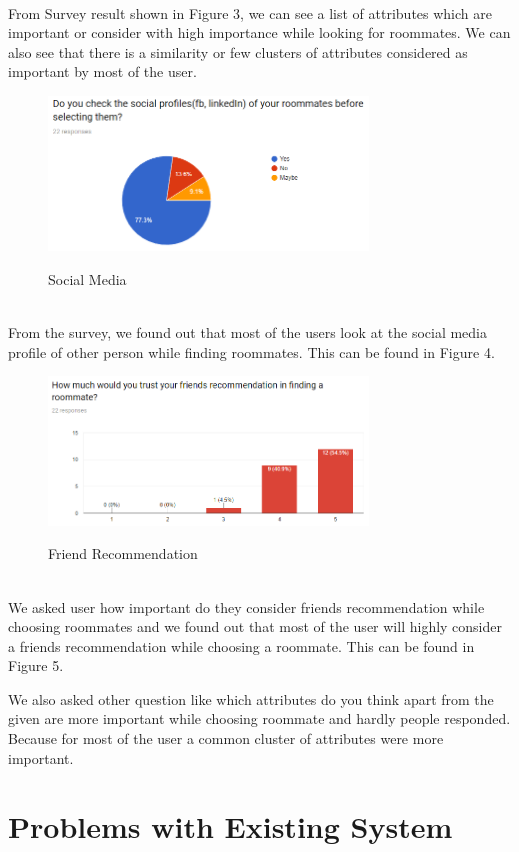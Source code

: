 \documentclass{sig-alternate-05-2015}
\begin{document}
\\
From Survey result shown in Figure 3, we can see a list of attributes which are important or consider with high importance while looking for roommates. We can also see that there is a similarity or few clusters of attributes considered as important by most of the user.
\\
\begin{figure}[h]
\centering
\includegraphics[width=8.5cm]{5.PNG}\\
\caption{Social Media}
\end{figure}
\\
From the survey, we found out that most of the users look at the social media profile of other person while finding roommates. This can be found in Figure 4.
\\
\begin{figure}[h]
\centering
\includegraphics[width=8.5cm]{6.PNG}\\
\caption{Friend Recommendation}
\end{figure}
\\
We asked user how important do they consider friends recommendation while choosing roommates and we found out that most of the user will highly consider a friends recommendation while choosing a roommate. This can be found in Figure 5.

We also asked other question like which attributes do you think apart from the given are more important while choosing roommate and hardly people responded. Because for most of the user a common cluster of attributes were more important.


\section{Problems with Existing System}
\end{document}
